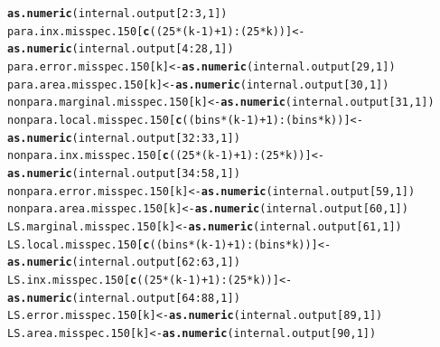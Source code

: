 \documentclass[11pt]{article}\usepackage[]{graphicx}\usepackage[]{color}
\makeatletter
\newcommand{\hlnum}[1]{\textcolor[rgb]{0.686,0.059,0.569}{#1}}%
\newcommand{\hlopt}[1]{\textcolor[rgb]{0,0,0}{#1}}%
\newcommand{\hlstd}[1]{\textcolor[rgb]{0.345,0.345,0.345}{#1}}%
\newcommand{\hlkwb}[1]{\textcolor[rgb]{0.69,0.353,0.396}{#1}}%
\newcommand{\hlkwd}[1]{\textcolor[rgb]{0.737,0.353,0.396}{\textbf{#1}}}%
\newenvironment{kframe}{%
 \def\at@end@of@kframe{}%
 \ifinner\ifhmode%
  \def\at@end@of@kframe{\end{minipage}}%
  \begin{minipage}{\columnwidth}%
 \fi\fi%
 \def\FrameCommand##1{\hskip\@totalleftmargin \hskip-\fboxsep
 \colorbox{shadecolor}{##1}\hskip-\fboxsep
     \hskip-\linewidth \hskip-\@totalleftmargin \hskip\columnwidth}%
 \MakeFramed {\advance\hsize-\width
   \@totalleftmargin\z@ \linewidth\hsize
   \@setminipage}}%
 {\par\unskip\endMakeFramed%
 \at@end@of@kframe}
\newenvironment{knitrout}{}{} %
\makeatother
\begin{document}
\begin{knitrout}
\begin{kframe}
\begin{alltt}
    \hlkwd{as.numeric}\hlstd{(internal.output[}\hlnum{2}\hlopt{:}\hlnum{3}\hlstd{,} \hlnum{1}\hlstd{])}
  \hlstd{para.inx.misspec.150[}\hlkwd{c}\hlstd{((}\hlnum{25}\hlopt{*}\hlstd{(k}\hlopt{-}\hlnum{1}\hlstd{)}\hlopt{+}\hlnum{1}\hlstd{)}\hlopt{:}\hlstd{(}\hlnum{25}\hlopt{*}\hlstd{k))]} \hlkwb{<-} \hlkwd{as.numeric}\hlstd{(internal.output[}\hlnum{4}\hlopt{:}\hlnum{28}\hlstd{,} \hlnum{1}\hlstd{])}
  \hlstd{para.error.misspec.150[k]} \hlkwb{<-} \hlkwd{as.numeric}\hlstd{(internal.output[}\hlnum{29}\hlstd{,} \hlnum{1}\hlstd{])}
  \hlstd{para.area.misspec.150[k]} \hlkwb{<-} \hlkwd{as.numeric}\hlstd{(internal.output[}\hlnum{30}\hlstd{,} \hlnum{1}\hlstd{])}
  \hlstd{nonpara.marginal.misspec.150[k]} \hlkwb{<-} \hlkwd{as.numeric}\hlstd{(internal.output[}\hlnum{31}\hlstd{,} \hlnum{1}\hlstd{])}
  \hlstd{nonpara.local.misspec.150[}\hlkwd{c}\hlstd{((bins}\hlopt{*}\hlstd{(k}\hlopt{-}\hlnum{1}\hlstd{)}\hlopt{+}\hlnum{1}\hlstd{)}\hlopt{:}\hlstd{(bins}\hlopt{*}\hlstd{k))]} \hlkwb{<-}
    \hlkwd{as.numeric}\hlstd{(internal.output[}\hlnum{32}\hlopt{:}\hlnum{33}\hlstd{,} \hlnum{1}\hlstd{])}
  \hlstd{nonpara.inx.misspec.150[}\hlkwd{c}\hlstd{((}\hlnum{25}\hlopt{*}\hlstd{(k}\hlopt{-}\hlnum{1}\hlstd{)}\hlopt{+}\hlnum{1}\hlstd{)}\hlopt{:}\hlstd{(}\hlnum{25}\hlopt{*}\hlstd{k))]} \hlkwb{<-}
    \hlkwd{as.numeric}\hlstd{(internal.output[}\hlnum{34}\hlopt{:}\hlnum{58}\hlstd{,} \hlnum{1}\hlstd{])}
  \hlstd{nonpara.error.misspec.150[k]} \hlkwb{<-} \hlkwd{as.numeric}\hlstd{(internal.output[}\hlnum{59}\hlstd{,} \hlnum{1}\hlstd{])}
  \hlstd{nonpara.area.misspec.150[k]} \hlkwb{<-} \hlkwd{as.numeric}\hlstd{(internal.output[}\hlnum{60}\hlstd{,} \hlnum{1}\hlstd{])}
  \hlstd{LS.marginal.misspec.150[k]} \hlkwb{<-} \hlkwd{as.numeric}\hlstd{(internal.output[}\hlnum{61}\hlstd{,} \hlnum{1}\hlstd{])}
  \hlstd{LS.local.misspec.150[}\hlkwd{c}\hlstd{((bins}\hlopt{*}\hlstd{(k}\hlopt{-}\hlnum{1}\hlstd{)}\hlopt{+}\hlnum{1}\hlstd{)}\hlopt{:}\hlstd{(bins}\hlopt{*}\hlstd{k))]} \hlkwb{<-}
    \hlkwd{as.numeric}\hlstd{(internal.output[}\hlnum{62}\hlopt{:}\hlnum{63}\hlstd{,} \hlnum{1}\hlstd{])}
  \hlstd{LS.inx.misspec.150[}\hlkwd{c}\hlstd{((}\hlnum{25}\hlopt{*}\hlstd{(k}\hlopt{-}\hlnum{1}\hlstd{)}\hlopt{+}\hlnum{1}\hlstd{)}\hlopt{:}\hlstd{(}\hlnum{25}\hlopt{*}\hlstd{k))]} \hlkwb{<-}
    \hlkwd{as.numeric}\hlstd{(internal.output[}\hlnum{64}\hlopt{:}\hlnum{88}\hlstd{,} \hlnum{1}\hlstd{])}
  \hlstd{LS.error.misspec.150[k]} \hlkwb{<-} \hlkwd{as.numeric}\hlstd{(internal.output[}\hlnum{89}\hlstd{,} \hlnum{1}\hlstd{])}
  \hlstd{LS.area.misspec.150[k]} \hlkwb{<-} \hlkwd{as.numeric}\hlstd{(internal.output[}\hlnum{90}\hlstd{,} \hlnum{1}\hlstd{])}

\end{alltt}
\end{kframe}
\end{knitrout}
\end{document}
